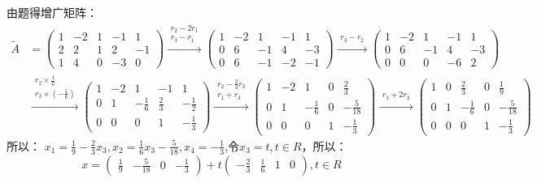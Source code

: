 \documentclass[a4paper]{report}
\begin{document}
\begin{jie}
由题得增广矩阵：
\begin{align*}
\widetilde{A}&=
\begin{pmatrix}
1&-2&1&-1&1\\
2&2&1&2&-1\\
1&4&0&-3&0
\end{pmatrix}
\xrightarrow{\substack{ r_2-2r_1\\ r_3-r_1}}{
\begin{pmatrix}
1&-2&1&-1&1\\
0&6&-1&4&-3\\
0&6&-1&-2&-1
\end{pmatrix}
}\xrightarrow{\substack{ r_3-r_2}}{
\begin{pmatrix}
1&-2&1&-1&1\\
0&6&-1&4&-3\\
0&0&0&-6&2
\end{pmatrix}
}\\
&\xrightarrow{\substack{ r_2\times\frac{1}{6}\\ r_3\times\left(-\frac{1}{6}\right)}}{
\begin{pmatrix}
1&-2&1&-1&1\\
0&1&-\frac{1}{6}&\frac{2}{3}&-\frac{1}{2}\\
0&0&0&1&-\frac{1}{3}
\end{pmatrix}
}\xrightarrow{\substack{ r_2-\frac{2}{3}r_3\\ r_1+r_3}}{
\begin{pmatrix}
1&-2&1&0&\frac{2}{3}\\
0&1&-\frac{1}{6}&0&-\frac{5}{18}\\
0&0&0&1&-\frac{1}{3}
\end{pmatrix}
}\xrightarrow{\substack{  r_1+2r_2}}{
\begin{pmatrix}
1&0&\frac{2}{3}&0&\frac{1}{9}\\
0&1&-\frac{1}{6}&0&-\frac{5}{18}\\
0&0&0&1&-\frac{1}{3}
\end{pmatrix}
}
\end{align*}
所以：
$x_1=\frac{1}{9}-\frac{2}{3}x_3,x_2=\frac{1}{6}x_3-\frac{5}{18},x_4=-\frac{1}{3}$,令$x_3=t,t\in R$，所以：
\begin{equation*}
x=
\begin{pmatrix}
\frac{1}{9}&-\frac{5}{18}&0&-\frac{1}{3}
\end{pmatrix}+t
\begin{pmatrix}
-\frac{2}{3}&\frac{1}{6}&1&0
\end{pmatrix},t\in R
\end{equation*}
\end{jie}
\end{document}
